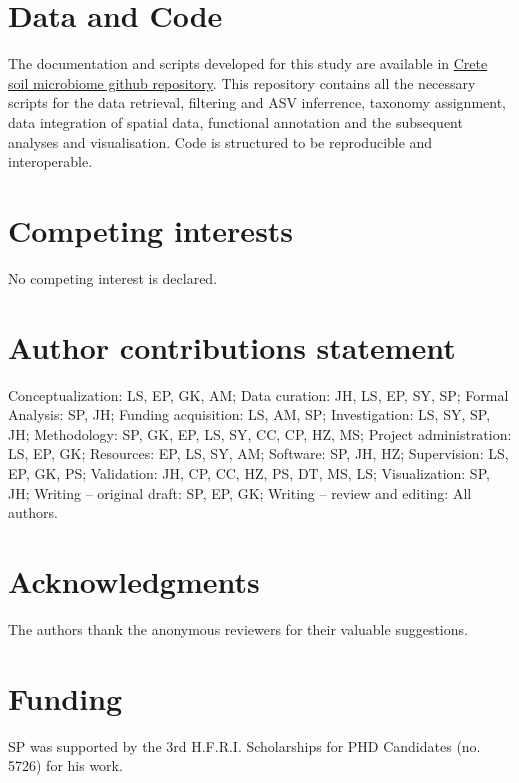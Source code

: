 \documentclass[unnumsec,webpdf,contemporary,large]{oup-authoring-template}%
\theoremstyle{thmstyleone}%
\theoremstyle{thmstyletwo}%
\theoremstyle{thmstylethree}%
\begin{document}
\section{Data and Code}
The documentation and scripts developed for this study are available in
\href{https://github.com/savvas-paragkamian/crete_soil_microbiome/}{Crete soil microbiome github repository}.
This repository contains all the necessary scripts for the data retrieval,
filtering and ASV inferrence, taxonomy assignment, data integration of spatial data, 
functional annotation and the subsequent analyses and visualisation.
Code is structured to be reproducible and interoperable.

\section{Competing interests}
No competing interest is declared.

\section{Author contributions statement}
Conceptualization: LS, EP, GK, AM;
Data curation: JH, LS, EP, SY, SP;
Formal Analysis: SP, JH;
Funding acquisition: LS, AM, SP;
Investigation: LS, SY, SP, JH;
Methodology: SP, GK, EP, LS, SY, CC, CP, HZ, MS;
Project administration: LS, EP, GK;
Resources: EP, LS, SY, AM;
Software: SP, JH, HZ;
Supervision: LS, EP, GK, PS;
Validation: JH, CP, CC, HZ, PS, DT, MS, LS;
Visualization: SP, JH;
Writing – original draft: SP, EP, GK;
Writing – review and editing: All authors.

\section{Acknowledgments}
The authors thank the anonymous reviewers for their valuable suggestions.

\section{Funding}
SP was supported by the 3rd H.F.R.I. Scholarships for PHD Candidates (no. 5726) for his work.





%
%
\end{document}
